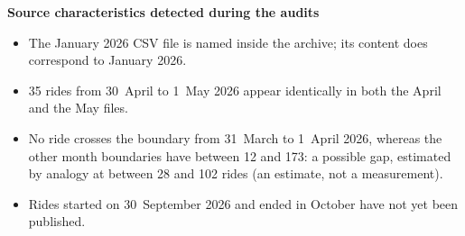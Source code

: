 \textbf{Source characteristics detected during the audits} \Mes
\begin{itemize}
  \item The January 2026 CSV file is named  inside the  archive; its content does correspond to January 2026.
  \item 35 rides from 30~April to 1~May 2026 appear identically in both the April and the May files.
  \item No ride crosses the boundary from 31~March to 1~April 2026, whereas the other month boundaries have between 12 and 173: a possible gap, estimated by analogy at between 28 and 102 rides (an estimate, not a measurement).
  \item Rides started on 30~September 2026 and ended in October have not yet been published.
\end{itemize}
